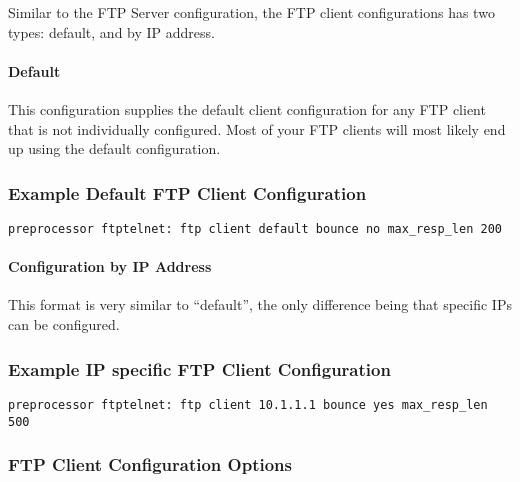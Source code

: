 \documentclass[english]{report}
\begin{document}
Similar to the FTP Server configuration, the FTP client configurations
has two types: default, and by IP address.

\paragraph{Default}

This configuration supplies the default client configuration for any FTP
client that is not individually configured.  Most of your FTP clients will
most likely end up using the default configuration.

\subsubsection{Example Default FTP Client Configuration}
\begin{verbatim}
preprocessor ftptelnet: ftp client default bounce no max_resp_len 200
\end{verbatim}

\paragraph{Configuration by IP Address}

This format is very similar to ``default'', the only difference being that
specific IPs can be configured.

\subsubsection{Example IP specific FTP Client Configuration}
\begin{verbatim}
preprocessor ftptelnet: ftp client 10.1.1.1 bounce yes max_resp_len 500
\end{verbatim}

\subsubsection{FTP Client Configuration Options}
\end{document}
